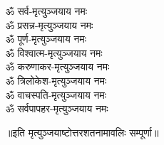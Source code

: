 \begin{multicols}{2}
\begin{flushleft}
ॐ सर्व-मृत्युञ्जयाय नमः\\
ॐ प्रसन्न-मृत्युञ्जयाय नमः\\
ॐ पूर्ण-मृत्युञ्जयाय नमः\\
ॐ विश्वात्म-मृत्युञ्जयाय नमः\\
ॐ करुणाकर-मृत्युञ्जयाय नमः\\
ॐ त्रिलोकेश-मृत्युञ्जयाय नमः\\
ॐ वाचस्पति-मृत्युञ्जयाय नमः\\
ॐ सर्वपापहर-मृत्युञ्जयाय नमः\\
\end{flushleft}
\end{multicols}
॥इति मृत्युञ्जयाष्टोत्तरशतनामावलिः सम्पूर्णा॥
